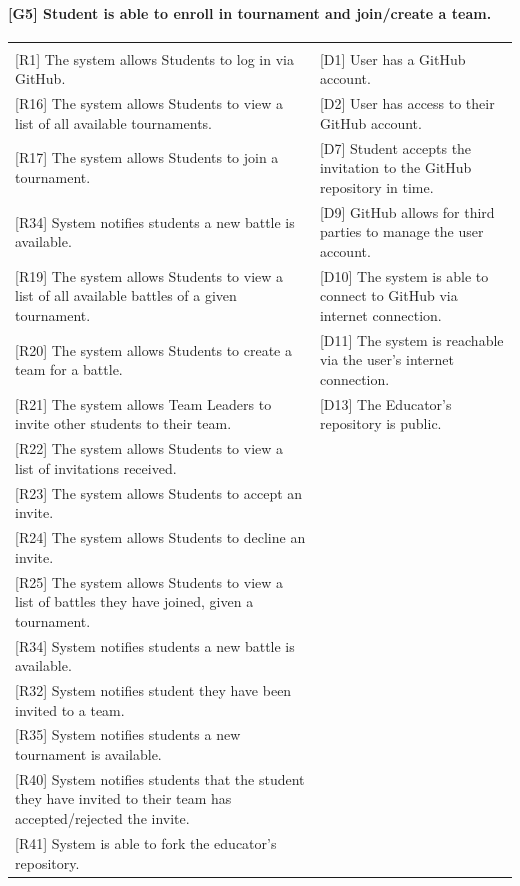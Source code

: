 \documentclass{article}
\begin{document}
\paragraph{[G5] Student is able to enroll in tournament and join/create a team.}
\begin{center}
\begin{tabular}{|m{20em}|m{20em}|}
\hline
& \\
{[R1]} The system allows Students to log in via GitHub. & 
{[D1]} User has a GitHub account.\\
{[R16]} The system allows Students to view a list of all available tournaments. & 
{[D2]} User has access to their GitHub account.\\
{[R17]} The system allows Students to join a tournament. & 
{[D7]} Student accepts the invitation to the GitHub repository in time.\\
{[R34]} System notifies students a new battle is available. & 
{[D9]} GitHub allows for third parties to manage the user account.\\
{[R19]} The system allows Students to view a list of all available battles of a given tournament. & 
{[D10]} The system is able to connect to GitHub via internet connection.\\
{[R20]} The system allows Students to create a team for a battle. & 
{[D11]} The system is reachable via the user's internet connection.\\
{[R21]} The system allows Team Leaders to invite other students to their team. & 
{[D13]} The Educator's repository is public.\\
{[R22]} The system allows Students to view a list of invitations received. & 
\\
{[R23]} The system allows Students to accept an invite. & 
\\
{[R24]} The system allows Students to decline an invite. & 
\\
{[R25]} The system allows Students to view a list of battles they have joined, given a tournament. & 
\\
{[R34]} System notifies students a new battle is available. & 
\\
{[R32]} System notifies student they have been invited to a team. & 
\\
{[R35]} System notifies students a new tournament is available.  & 
\\
{[R40]} System notifies students that the student they have invited to their team has accepted/rejected the invite. & 
\\
{[R41]} System is able to fork the educator’s repository. & 
\\
\hline
\end{tabular}
\end{center}
\end{document}
